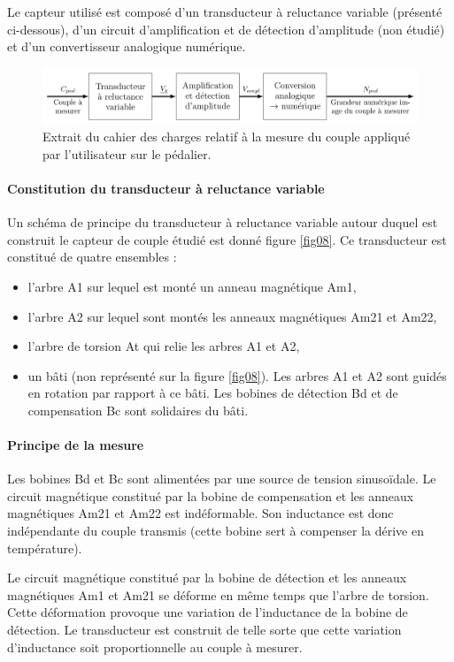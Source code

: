 Le capteur utilisé est composé d'un transducteur à reluctance variable (présenté ci-dessous), d'un circuit
d'amplification et de détection d'amplitude (non étudié) et d'un convertisseur analogique numérique.

\begin{figure}[ht!]
\begin{center}
\includegraphics[width=.8\linewidth]{img/fig07}
\caption{\label{fig07}Extrait du cahier des charges relatif à la mesure du couple appliqué par l'utilisateur sur le pédalier.}
\end{center}
\end{figure}

\paragraph{Constitution du transducteur à reluctance variable} Un schéma de principe du transducteur à reluctance variable autour duquel est construit le capteur de couple étudié est donné figure \ref{fig08}. Ce transducteur est constitué de quatre ensembles :
\begin{itemize}
 \item l'arbre A1 sur lequel est monté un anneau magnétique Am1,
 \item l'arbre A2 sur lequel sont montés les anneaux magnétiques Am21 et Am22,
 \item l'arbre de torsion At qui relie les arbres A1 et A2,
 \item un bâti (non représenté sur la figure \ref{fig08}). Les arbres A1 et A2 sont guidés en rotation par rapport à ce bâti. Les bobines de détection Bd et de compensation Bc sont solidaires du bâti.
\end{itemize}

\paragraph{Principe de la mesure} Les bobines Bd et Bc sont alimentées par une source de tension sinusoïdale.
Le circuit magnétique constitué par la bobine de compensation et les anneaux magnétiques Am21 et Am22
est indéformable. Son inductance est donc indépendante du couple transmis (cette bobine sert à compenser la
dérive en température).

Le circuit magnétique constitué par la bobine de détection et les anneaux magnétiques Am1 et Am21 se
déforme en même temps que l'arbre de torsion. Cette déformation provoque une variation de l'inductance de la
bobine de détection. Le transducteur est construit de telle sorte que cette variation d'inductance soit proportionnelle au couple à mesurer.

